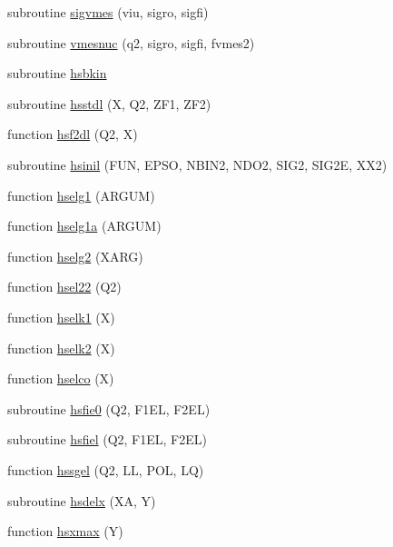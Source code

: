 \begin{DoxyCompactItemize}
\item 
subroutine \hyperlink{djangoh__h_8f_a6b980956c078e121e1a7215a2033efad}{sigvmes} (viu, sigro, sigfi)
\item 
subroutine \hyperlink{djangoh__h_8f_a77d015292013fd43ec8c22102bd3f550}{vmesnuc} (q2, sigro, sigfi, fvmes2)
\item 
subroutine \hyperlink{djangoh__h_8f_a5e61ca26c7b285c1b231be49df0c1fdb}{hsbkin}
\item 
subroutine \hyperlink{djangoh__h_8f_a69a769d947e8150681e184e966997652}{hsstdl} (X, Q2, Z\+F1, Z\+F2)
\item 
function \hyperlink{djangoh__h_8f_a889395a2e5655e2cea59aa3215b56ff8}{hsf2dl} (Q2, X)
\item 
subroutine \hyperlink{djangoh__h_8f_a3b2f69058ed4caa4de9dcd7a354e5a66}{hsinil} (F\+U\+N, E\+P\+S\+O, N\+B\+I\+N2, N\+D\+O2, S\+I\+G2, S\+I\+G2\+E, X\+X2)
\item 
function \hyperlink{djangoh__h_8f_ac3a86192d187044a13047ea990ad9079}{hselg1} (A\+R\+G\+U\+M)
\item 
function \hyperlink{djangoh__h_8f_ae3b7e021ca653222e9704c83c1c62d24}{hselg1a} (A\+R\+G\+U\+M)
\item 
function \hyperlink{djangoh__h_8f_a31c1778a5988cfebe7a8c9fc65d561cf}{hselg2} (X\+A\+R\+G)
\item 
function \hyperlink{djangoh__h_8f_a444405a7ca832443f03f235ab4efea18}{hsel22} (Q2)
\item 
function \hyperlink{djangoh__h_8f_a52675b786d943b4b137f55f92362885f}{hselk1} (X)
\item 
function \hyperlink{djangoh__h_8f_abfd1ed17ed52e9e98daa59db1fdd5593}{hselk2} (X)
\item 
function \hyperlink{djangoh__h_8f_a97c6a1c094567f2b4a4bd8e79ce664eb}{hselco} (X)
\item 
subroutine \hyperlink{djangoh__h_8f_a8c3ca4edf306f5b2b276da4dfee854d7}{hsfie0} (Q2, F1\+E\+L, F2\+E\+L)
\item 
subroutine \hyperlink{djangoh__h_8f_aa7cd38bce4aef6013280e31f71bdc178}{hsfiel} (Q2, F1\+E\+L, F2\+E\+L)
\item 
function \hyperlink{djangoh__h_8f_a918dcf0a3a5bd7f308fc93c75334a9f4}{hssgel} (Q2, L\+L, P\+O\+L, L\+Q)
\item 
subroutine \hyperlink{djangoh__h_8f_ad7162d5427175126bfe004753ea1bd70}{hsdelx} (X\+A, Y)
\item 
function \hyperlink{djangoh__h_8f_ab9eabf4f063a0cd023ce1a85f9bf8032}{hsxmax} (Y)
\item 

\end{DoxyCompactItemize}
